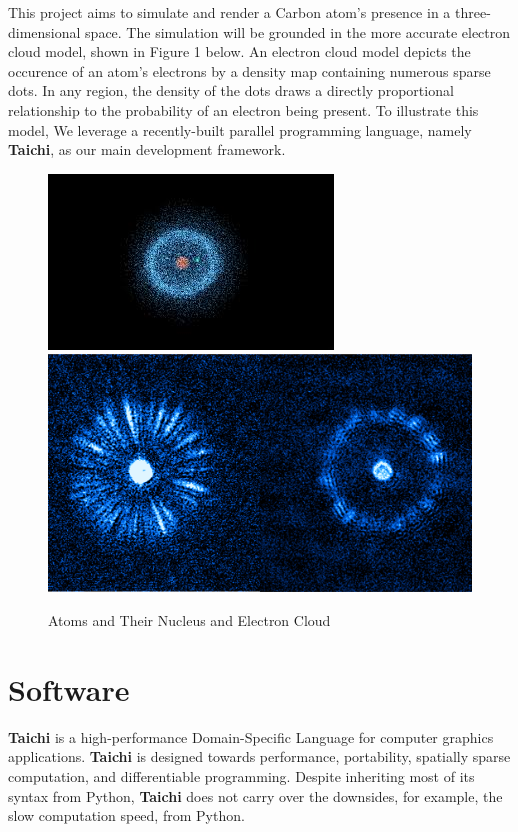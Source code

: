 \documentclass[acmtog]{acmart}
\begin{document}
This project aims to simulate and render a Carbon atom's presence in a three-dimensional space. The simulation will be grounded in the more accurate electron cloud model, shown in Figure 1 below. An electron cloud model depicts the occurence of an atom's electrons by a density map containing numerous sparse dots. In any region, the density of the dots draws a directly proportional relationship to the probability of an electron being present. To illustrate this model, We leverage a recently-built parallel programming language, namely \textbf{Taichi}, as our main development framework.

\begin{figure}[h]
  \centering
  \includegraphics[width=\linewidth]{./concept_1.jpeg}
  \includegraphics[width=\linewidth]{./concept_2.png}
  \caption{Atoms and Their Nucleus and Electron Cloud}
\end{figure}

\section{Software}
\textbf{Taichi} is a high-performance Domain-Specific Language for computer graphics applications. \textbf{Taichi} is designed towards performance, portability, spatially sparse computation, and differentiable programming. Despite inheriting most of its syntax from Python, \textbf{Taichi} does not carry over the downsides, for example, the slow computation speed, from Python.
\end{document}
